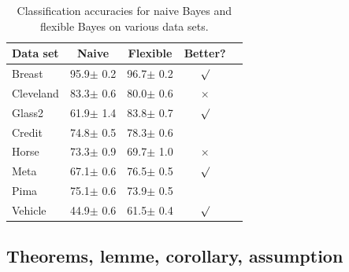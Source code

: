\documentclass{article}
\theoremstyle{plain}
\theoremstyle{definition}
\theoremstyle{remark}
\begin{document}
\begin{table}[t]
\caption{Classification accuracies for naive Bayes and flexible
Bayes on various data sets.}
\label{sample-table}
\vskip 0.15in
\begin{center}
\begin{small}
\begin{sc}
\begin{tabular}{lcccr}
\toprule
Data set & Naive & Flexible & Better? \\
\midrule
Breast    & 95.9$\pm$ 0.2& 96.7$\pm$ 0.2& $\surd$ \\
Cleveland & 83.3$\pm$ 0.6& 80.0$\pm$ 0.6& $\times$\\
Glass2    & 61.9$\pm$ 1.4& 83.8$\pm$ 0.7& $\surd$ \\
Credit    & 74.8$\pm$ 0.5& 78.3$\pm$ 0.6&         \\
Horse     & 73.3$\pm$ 0.9& 69.7$\pm$ 1.0& $\times$\\
Meta      & 67.1$\pm$ 0.6& 76.5$\pm$ 0.5& $\surd$ \\
Pima      & 75.1$\pm$ 0.6& 73.9$\pm$ 0.5&         \\
Vehicle   & 44.9$\pm$ 0.6& 61.5$\pm$ 0.4& $\surd$ \\
\bottomrule
\end{tabular}
\end{sc}
\end{small}
\end{center}
\vskip -0.1in
\end{table}

\subsection{Theorems, lemme, corollary, assumption} %







\newpage
\appendix
\onecolumn
\section{}
\end{document}
